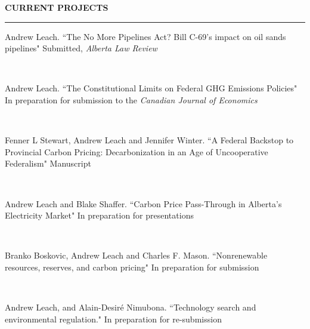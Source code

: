 \documentclass{article}[12pt]
\newcommand{\negind}{\hspace*{-15pt}}
\newcommand{\inprogress}[3]{\parbox[b]{.93\textwidth}{\negind #1. ``#2" #3  }
\\[-.65ex] \hfill}
\newcommand{\justlist}[1]{\negind #1 \smallskip}
\begin{document}
\medskip                                                            %
\noindent \textbf{{\large CURRENT PROJECTS}}


\medskip
{\large\scshape\hrule\vspace{0.8\baselineskip}} %
\medskip                                                            %



\inprogress{Andrew Leach}{The No More Pipelines Act? Bill C-69’s impact on oil sands pipelines}{Submitted, \textit{Alberta Law Review}}

\inprogress{Andrew Leach}{The Constitutional Limits on Federal GHG Emissions Policies}{In preparation for submission to the \textit{Canadian Journal of Economics}}

\inprogress{Fenner L Stewart, Andrew Leach and Jennifer Winter}{A Federal Backstop to Provincial Carbon Pricing: Decarbonization in an Age of Uncooperative Federalism}{Manuscript}

\inprogress{Andrew Leach and Blake Shaffer}{Carbon Price Pass-Through in Alberta's Electricity Market}{In preparation for presentations}

\inprogress{Branko Boskovic, Andrew Leach and Charles F. Mason}{Nonrenewable resources, reserves, and carbon pricing}{In preparation for submission}

\inprogress{Andrew Leach, and Alain-Desir\'{e} Nimubona}{Technology search and environmental regulation.}{In preparation for re-submission}

\end{document}
